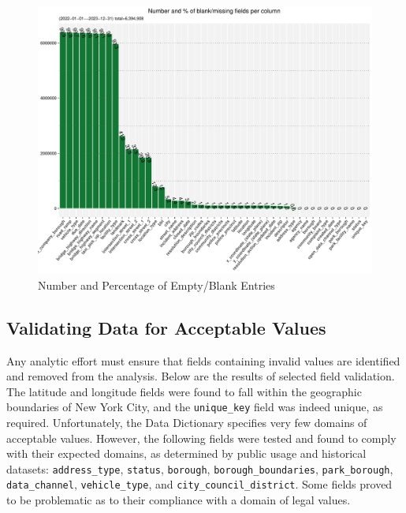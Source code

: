 \documentclass[linenumber]{jdsart}
\begin{document}
\begin{figure}[tbp]
	\centering
  	\includegraphics[width=\textwidth]{BlankFields.pdf}
	\caption{Number and Percentage of Empty/Blank Entries}
	\label{fig:blank_fields}
\end{figure}


\subsection{Validating Data for Acceptable Values}
\label{sec:domain}
Any analytic effort must ensure that fields containing invalid values 
are identified and removed from the analysis. Below are the results of 
selected field validation. The latitude and longitude fields were 
found to fall within the geographic boundaries of New York City, and 
the \texttt{unique\_key} field was indeed unique, as required. 
Unfortunately, the Data Dictionary specifies very few domains of 
acceptable values. However, the following fields were tested and found 
to comply with their expected domains, as determined by public usage 
and historical datasets: \texttt{address\_type}, \texttt{status}, 
\texttt{borough}, \texttt{borough\_boundaries}, \texttt{park\_borough}, 
\texttt{data\_channel}, \texttt{vehicle\_type}, and 
\texttt{city\_council\_district}. Some fields proved to be problematic 
as to their compliance with a domain of legal values. 
\end{document}
